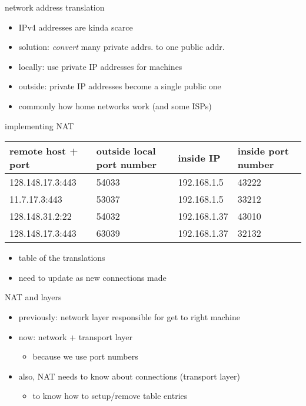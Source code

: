 \begin{frame}{network address translation}
\begin{itemize}
\item IPv4 addresses are kinda scarce
\item solution: \textit{convert} many private addrs. to one public addr.
\item locally: use private IP addresses for machines
\item outside: private IP addresses become a single public one
\item commonly how home networks work (and some ISPs)
\end{itemize}
\end{frame}

\begin{frame}{implementing NAT}
\small
\begin{tabular}{llll}
remote host + port & outside local port number & inside IP & inside port number \\ \hline
128.148.17.3:443 & 54033 & 192.168.1.5 & 43222 \\
11.7.17.3:443 & 53037 & 192.168.1.5 & 33212 \\
128.148.31.2:22 & 54032 & 192.168.1.37 & 43010 \\
128.148.17.3:443 & 63039 & 192.168.1.37 & 32132 \\
\end{tabular}
\begin{itemize}
\item table of the translations
\item need to update as new connections made
\end{itemize}
\end{frame}

\begin{frame}{NAT and layers}
    \begin{itemize}
    \item previously: network layer responsible for get to right machine
    \item now: network + transport layer
        \begin{itemize}
        \item because we use port numbers
        \end{itemize}
    \item also, NAT needs to know about connections (transport layer)
        \begin{itemize}
        \item to know how to setup/remove table entries
        \end{itemize}
    \end{itemize}
\end{frame}
